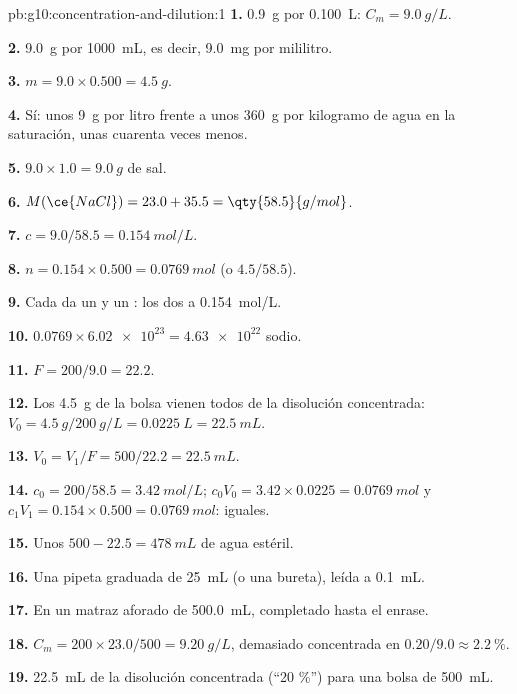 \begin{solution}{pb:g10:concentration-and-dilution:1}
\textbf{1.} \qty{0.9}{g} por \qty{0.100}{L}: $C_m = \qty{9.0}{g/L}$.

\textbf{2.} \qty{9.0}{g} por \qty{1000}{mL}, es decir, \qty{9.0}{mg} por
mililitro.

\textbf{3.} $m = 9.0 \times 0.500 = \qty{4.5}{g}$.

\textbf{4.} Sí: unos \qty{9}{g} por litro frente a unos \qty{360}{g} por
kilogramo de agua en la saturación, unas cuarenta veces menos.

\textbf{5.} $9.0 \times 1.0 = \qty{9.0}{g}$ de sal.

\textbf{6.} $M(\ce{NaCl}) = 23.0 + 35.5 = \qty{58.5}{g/mol}$.

\textbf{7.} $c = 9.0 / 58.5 = \qty{0.154}{mol/L}$.

\textbf{8.} $n = 0.154 \times 0.500 = \qty{0.0769}{mol}$ (o
$4.5 / 58.5$).

\textbf{9.} Cada  da un  y un : los dos a
\qty{0.154}{mol/L}.

\textbf{10.} $0.0769 \times \num{6.02e23} = \num{4.63e22}$  sodio.

\textbf{11.} $F = 200 / 9.0 = 22.2$.

\textbf{12.} Los \qty{4.5}{g} de la bolsa vienen todos de la disolución
concentrada: $V_0 = \qty{4.5}{g} / \qty{200}{g/L} = \qty{0.0225}{L} =
\qty{22.5}{mL}$.

\textbf{13.} $V_0 = V_1 / F = 500 / 22.2 = \qty{22.5}{mL}$.

\textbf{14.} $c_0 = 200 / 58.5 = \qty{3.42}{mol/L}$;
$c_0 V_0 = 3.42 \times 0.0225 = \qty{0.0769}{mol}$ y
$c_1 V_1 = 0.154 \times 0.500 = \qty{0.0769}{mol}$: iguales.

\textbf{15.} Unos $500 - 22.5 = \qty{478}{mL}$ de agua estéril.

\textbf{16.} Una pipeta graduada de \qty{25}{mL} (o una bureta), leída
a \qty{0.1}{mL}.

\textbf{17.} En un matraz aforado de \qty{500.0}{mL}, completado hasta
el enrase.

\textbf{18.} $C_m = 200 \times 23.0 / 500 = \qty{9.20}{g/L}$, demasiado
concentrada en $0.20 / 9.0 \approx \qty{2.2}{\percent}$.

\textbf{19.} \qty{22.5}{mL} de la disolución concentrada (``20 \%'')
para una bolsa de \qty{500}{mL}.
\end{solution}
